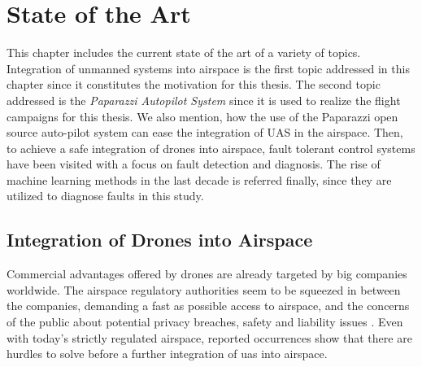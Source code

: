 
{}

\chapter{State of the Art}

This chapter includes the current state of the art of a variety of topics.
Integration of unmanned systems into airspace is the first topic addressed in this chapter since it constitutes the motivation for this thesis.
The second topic addressed is the \emph{Paparazzi Autopilot System} since it is used to realize the flight campaigns for this thesis. 
We also mention, how the use of the Paparazzi open source auto-pilot system can ease the integration of UAS in the airspace. 
Then, to achieve a safe integration of drones into airspace, fault tolerant control systems have been visited with a focus on fault detection and diagnosis.
The rise of machine learning methods in the last decade is referred finally, since they are utilized to diagnose faults in this study.

\section{Integration of Drones into Airspace}

Commercial advantages offered by drones are already targeted by big companies worldwide. 
The airspace regulatory authorities seem to be squeezed in between the companies, demanding a fast as possible access to airspace, and the concerns of the public about potential privacy breaches, 
safety and liability issues \cite{droneDisasters,droneImageProblem}. 
Even with today's strictly regulated airspace, reported occurrences show that there are hurdles to solve before a further integration of \gls{uas} into airspace.

